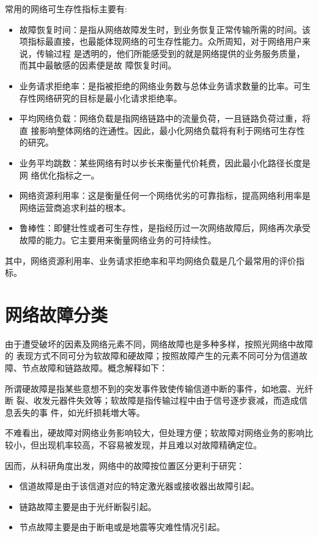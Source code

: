 常用的网络可生存性指标主要有:
\begin{itemize}
  \item 故障恢复时间：是指从网络故障发生时，到业务恢复正常传输所需的时间。该 项指标最直接，也最能体现网络的可生存性能力。众所周知，对于网络用户来说，传输过程 是透明的，他们所能感受到的就是网络提供的业务服务质量，而其中最敏感的因素便是故 障恢复时间。
  \item 业务请求拒绝率：是指被拒绝的网络业务数与总体业务请求数量的比率。可生存性网络研究的目标是最小化请求拒绝率。
  \item 平均网络负载：网络负载是指网络链路中的流量负荷，一且链路负荷过重，将直 接影响整体网络的迕通性。因此，最小化网络负载将有利于网络可生存性的研究。
  \item 业务平均跳数：某些网络有时以步长来衡量代价耗费，因此最小化路径长度是网 络优化指标之一。
  \item 网络资源利用率：这是衡量任何一个网络优劣的可靠指标，提高网络利用率是网络运营商追求利益的根本。
  \item 鲁棒性：即健壮性或者可生存性，是指经历过一次网络故障后，网络再次承受故障的能力。它主要用来衡量网络业务的可持续性。
\end{itemize}
其中，网络资源利用率、业务请求拒绝率和平均网络负载是几个最常用的评价指标。


\section{网络故障分类}
由于遭受破坏的因素及网络元素不同，网络故障也是多种多样，按照光网络中故障的 表现方式不同可分为软故障和硬故障；按照故障产生的元素不同可分为信道故障、节点故障和链路故障。概念解释如下：

所谓硬故障是指某些意想不到的突发事件致使传输信道中断的事件，如地震、光纤断 裂、收发元器件失效等；软故障是指传输过程中由于信号逐步衰减，而造成信息丢失的事 件，如光纤损耗増大等。

不难看出，硬故障对网络业务影响较大，但处理方便；软故障对网络业务的影响比较小，但出现机率较高，不容易被发现，并且难以对故障精确定位。

因而，从科研角度出发，网络中的故障按位置区分更利于研究：
\begin{itemize}
\item 信道故障是由于该信道对应的特定激光器或接收器出故障引起。
\item 链路故障主要是由于光纤断裂引起。
\item 节点故障主要是由于断电或是地震等灾难性情况引起。
\end{itemize}



